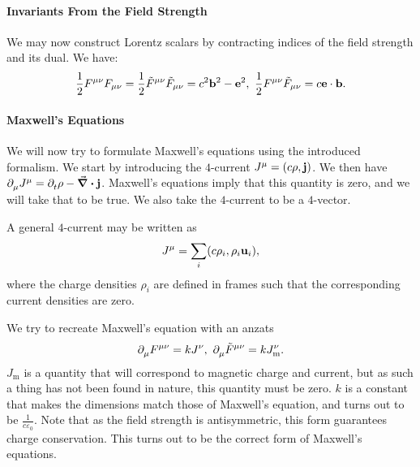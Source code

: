 \paragraph{Invariants From the Field Strength}
We may now construct Lorentz scalars by contracting indices of the field strength and its dual. We have:
\begin{align*}
	\frac{1}{2}F^{\mu\nu}F_{\mu\nu} = \frac{1}{2}\tilde{F}^{\mu\nu}\tilde{F}_{\mu\nu} = c^{2}\vb{b}^{2} - \vb{e}^{2},\ \frac{1}{2}F^{\mu\nu}\tilde{F}_{\mu\nu} = c\vb{e}\cdot\vb{b}.
\end{align*}

\paragraph{Maxwell's Equations}
We will now try to formulate Maxwell's equations using the introduced formalism. We start by introducing the $4$-current $J^{\mu} = (c\rho, \vb{j})$. We then have $\partial^{}_{\mu}J^{\mu} = \partial^{}_{t}\rho - \div{\vb{j}}$. Maxwell's equations imply that this quantity is zero, and we will take that to be true. We also take the $4$-current to be a $4$-vector.

A general $4$-current may be written as
\begin{align*}
	J^{\mu} = \sum\limits_{i}(c\rho_{i}, \rho_{i}\vb{u}_{i}),
\end{align*}
where the charge densities $\rho_{i}$ are defined in frames such that the corresponding current densities are zero.

We try to recreate Maxwell's equation with an anzats
\begin{align*}
	\partial^{}_{\mu}F^{\mu\nu} = kJ^{\nu},\ \partial^{}_{\mu}\tilde{F}^{\mu\nu} = kJ_{\text{m}}^{\nu}.
\end{align*}
$J_{\text{m}}$ is a quantity that will correspond to magnetic charge and current, but as such a thing has not been found in nature, this quantity must be zero. $k$ is a constant that makes the dimensions match those of Maxwell's equation, and turns out to be $\frac{1}{c\varepsilon_{0}}$. Note that as the field strength is antisymmetric, this form guarantees charge conservation. This turns out to be the correct form of Maxwell's equations.